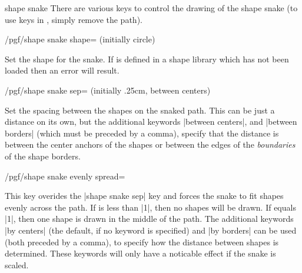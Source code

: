 \begin{snake}{shape snake}
	There are various keys to control the drawing of the shape snake (to
	use \pgfname{} keys in \tikzname{}, simply remove the 
	 path).

\begin{key}{/pgf/shape snake shape= (initially circle)}

	Set the shape for the snake. If  is defined in a shape
	library which has not been loaded then an error will result.
	
\end{key}

\begin{key}{/pgf/shape snake sep= (initially {.25cm, between centers})}

	Set the spacing between the shapes on the snaked path. This can be
	just a distance on its own, but the additional keywords 
	|between centers|, and |between borders| (which must be preceded by a 
	comma), specify that the distance	is between the center anchors of 
	the shapes or between the edges of the \emph{boundaries} of
	the shape borders.
	
\begin{codeexample}[]
\end{codeexample}

\end{key}


  
\begin{key}{/pgf/shape snake evenly spread=}

  This key overides the |shape snake sep| key and forces the snake to
  fit  shapes evenly across the path. 
  If  is less than |1|, then no shapes will be drawn. 
  If  equals |1|, then one shape is drawn in the middle 
  of the path. 
  The additional keywords |by centers| (the default, if no keyword is
  specified) and |by borders| can be used (both preceded by a comma), 
  to specify how the distance between shapes is determined. These
  keywords will only have a noticable effect if the snake is scaled.
  

\end{key}
\end{snake}
